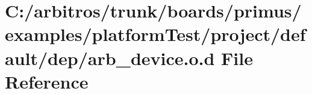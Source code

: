 \hypertarget{platform_test_2project_2default_2dep_2arb__device_8o_8d}{\section{C\-:/arbitros/trunk/boards/primus/examples/platform\-Test/project/default/dep/arb\-\_\-device.o.\-d File Reference}
\label{platform_test_2project_2default_2dep_2arb__device_8o_8d}
}
